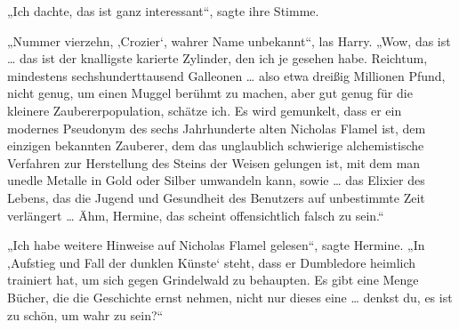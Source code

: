 „Ich dachte, das ist ganz interessant“, sagte ihre Stimme.

„Nummer vierzehn, ‚Crozier‘, wahrer Name unbekannt“, las Harry.
„Wow, das ist … das ist der knalligste karierte Zylinder, den ich je gesehen habe. Reichtum, mindestens sechshunderttausend Galleonen … also etwa dreißig Millionen Pfund, nicht genug, um einen Muggel berühmt zu machen, aber gut genug für die kleinere Zaubererpopulation, schätze ich. Es wird gemunkelt, dass er ein modernes Pseudonym des sechs Jahrhunderte alten Nicholas Flamel ist, dem einzigen bekannten Zauberer, dem das unglaublich schwierige alchemistische Verfahren zur Herstellung des Steins der Weisen gelungen ist, mit dem man unedle Metalle in Gold oder Silber umwandeln kann, sowie … das Elixier des Lebens, das die Jugend und Gesundheit des Benutzers auf unbestimmte Zeit verlängert … Ähm, Hermine, das scheint offensichtlich falsch zu sein.“

„Ich habe weitere Hinweise auf Nicholas Flamel gelesen“, sagte Hermine.
„In ‚Aufstieg und Fall der dunklen Künste‘ steht, dass er Dumbledore heimlich trainiert hat, um sich gegen Grindelwald zu behaupten. Es gibt eine Menge Bücher, die die Geschichte ernst nehmen, nicht nur dieses eine … denkst du, es ist zu schön, um wahr zu sein?“

